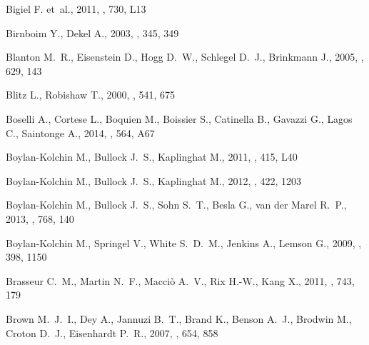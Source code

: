 \documentclass[usenatbib]{mn2e}
\begin{document}
\begin{thebibliography}{157}
{Bigiel} F. {et~al.}, 2011, \apjl, 730, L13

{Birnboim} Y., {Dekel} A., 2003, \mnras, 345, 349

{Blanton} M.~R., {Eisenstein} D., {Hogg} D.~W., {Schlegel} D.~J., {Brinkmann}
  J., 2005, \apj, 629, 143

{Blitz} L., {Robishaw} T., 2000, \apj, 541, 675

{Boselli} A., {Cortese} L., {Boquien} M., {Boissier} S., {Catinella} B.,
  {Gavazzi} G., {Lagos} C., {Saintonge} A., 2014, \aap, 564, A67

{Boylan-Kolchin} M., {Bullock} J.~S., {Kaplinghat} M., 2011, \mnras, 415, L40

{Boylan-Kolchin} M., {Bullock} J.~S., {Kaplinghat} M., 2012, \mnras, 422, 1203

{Boylan-Kolchin} M., {Bullock} J.~S., {Sohn} S.~T., {Besla} G., {van der Marel}
  R.~P., 2013, \apj, 768, 140

{Boylan-Kolchin} M., {Springel} V., {White} S.~D.~M., {Jenkins} A., {Lemson}
  G., 2009, \mnras, 398, 1150

{Brasseur} C.~M., {Martin} N.~F., {Macci{\`o}} A.~V., {Rix} H.-W., {Kang} X.,
  2011, \apj, 743, 179

{Brown} M.~J.~I., {Dey} A., {Jannuzi} B.~T., {Brand} K., {Benson} A.~J.,
  {Brodwin} M., {Croton} D.~J., {Eisenhardt} P.~R., 2007, \apj, 654, 858


\end{thebibliography}
\end{document}
